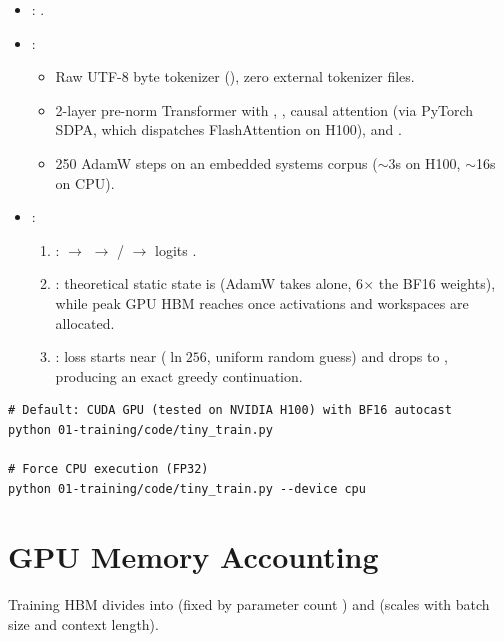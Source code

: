 \begin{itemize}
    \item {}: .
    \item {}:
    \begin{itemize}
        \item Raw UTF-8 byte tokenizer (), zero external tokenizer files.
        \item 2-layer pre-norm Transformer with , ,  causal attention (via PyTorch SDPA, which dispatches FlashAttention on H100), and .
        \item 250 AdamW steps on an embedded systems corpus ($\sim$3s on H100, $\sim$16s on CPU).
    \end{itemize}
    \item {}:
    \begin{enumerate}
        \item {}:  $\rightarrow$  $\rightarrow$   /   $\rightarrow$ logits .
        \item {}: theoretical static state is  (AdamW takes  alone, 6$\times$ the BF16 weights), while peak GPU HBM reaches  once activations and workspaces are allocated.
        \item {}: loss starts near  ($\ln 256$, uniform random guess) and drops to , producing an exact greedy continuation.
    \end{enumerate}
\end{itemize}

\begin{lstlisting}
# Default: CUDA GPU (tested on NVIDIA H100) with BF16 autocast
python 01-training/code/tiny_train.py

# Force CPU execution (FP32)
python 01-training/code/tiny_train.py --device cpu
\end{lstlisting}

\section{GPU Memory Accounting}

Training HBM divides into  (fixed by parameter count ) and  (scales with batch size and context length).

